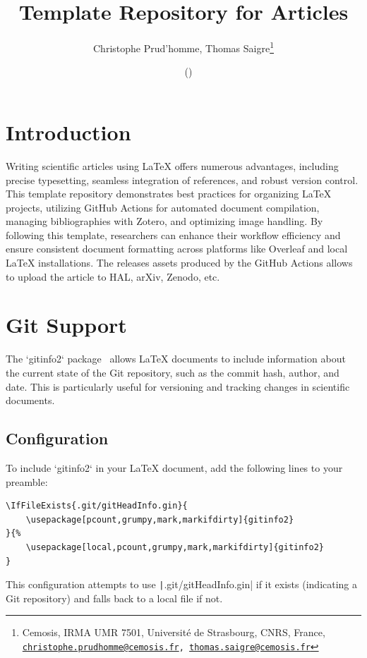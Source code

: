 \documentclass[a4paper]{article}
\title{Template Repository for Articles}
\author{Christophe Prud'homme, Thomas Saigre\thanks{Cemosis, IRMA UMR 7501, Université de Strasbourg, CNRS, France, \tt \href{mailto:christophe.prudhomme@cemosis.fr}{christophe.prudhomme@cemosis.fr},  \href{mailto:thomas.saigre@cemosis.fr}{thomas.saigre@cemosis.fr}}}
\date{\gitReln\  \gitAuthorDate\ (\gitAbbrevHash)}
\begin{document}
\maketitle
\tableofcontents

\section{Introduction}
\label{sec:introduction}

Writing scientific articles using \LaTeX{} offers numerous advantages, including precise typesetting, seamless integration of references, and robust version control.
This template repository demonstrates best practices for organizing \LaTeX{} projects, utilizing GitHub Actions for automated document compilation, managing bibliographies with Zotero, and optimizing image handling.
By following this template, researchers can enhance their workflow efficiency and ensure consistent document formatting across platforms like Overleaf and local \LaTeX{} installations.
The releases assets produced by the GitHub Actions allows to upload the article to HAL, arXiv, Zenodo, etc.



\section{Git Support}
\label{sec:git-support}

The `gitinfo2` package~\citep{brent_longborough_gitinfo2sty_2015} allows \LaTeX{} documents to include information about the current state of the Git repository, such as the commit hash, author, and date. This is particularly useful for versioning and tracking changes in scientific documents.

\subsection{Configuration}

To include `gitinfo2` in your \LaTeX{} document, add the following lines to your preamble:

\begin{verbatim}
\IfFileExists{.git/gitHeadInfo.gin}{
    \usepackage[pcount,grumpy,mark,markifdirty]{gitinfo2}
}{%
    \usepackage[local,pcount,grumpy,mark,markifdirty]{gitinfo2}
}
\end{verbatim}

This configuration attempts to use \texttt|.git/gitHeadInfo.gin| if it exists (indicating a Git repository) and falls back to a local file if not.
\end{document}
